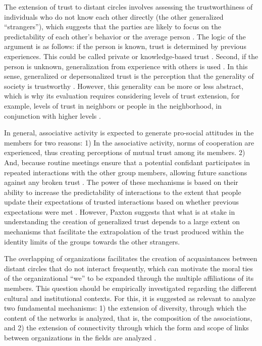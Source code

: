 The extension of trust to distant circles involves assessing the trustworthiness of individuals who do not know each other directly (the other generalized “strangers”), which suggests that the parties are likely to focus on the predictability of each other's behavior or the average person \parencite{glanville_why_2016,paxton_association_2007,paxton_is_2015}. The logic of the argument is as follows: if the person is known, trust is determined by previous experiences. This could be called private or knowledge-based trust \parencite{yamagishi_trust_1994,stolle_clubs_2001}. Second, if the person is unknown, generalization from experience with others is used \parencite{hardin_conceptions_2001}. In this sense, generalized or depersonalized trust is the perception that the generality of society is trustworthy \parencite{glanville_social_2013,paxton_social_2002,paxton_association_2007}. However, this generality can be more or less abstract, which is why its evaluation requires considering levels of trust extension, for example, levels of trust in neighbors or people in the neighborhood, in conjunction with higher levels \parencite{glanville_why_2016}.
\bigskip

In general, associative activity is expected to generate pro-social attitudes in the members for two reasons: 1) In the associative activity, norms of cooperation are experienced, thus creating perceptions of mutual trust among its members. 2) And, because routine meetings ensure that a potential confidant participates in repeated interactions with the other group members, allowing future sanctions against any broken trust \parencite{axelrod_evolution_1984,paxton_trust_2018}. The power of these mechanisms is based on their ability to increase the predictability of interactions to the extent that people update their expectations of trusted interactions based on whether previous expectations were met \parencite{paxton_trust_2018}. However, Paxton \citeyear{paxton_association_2007} suggests that what is at stake in understanding the creation of generalized trust depends to a large extent on mechanisms that facilitate the extrapolation of the trust produced within the identity limits of the groups towards the other strangers.
\bigskip

The overlapping of organizations facilitates the creation of acquaintances between distant circles that do not interact frequently, which can motivate the moral ties of the organizational “we” to be expanded through the multiple affiliations of its members. This question should be empirically investigated regarding the different cultural and institutional contexts. For this, it is suggested as relevant to analyze two fundamental mechanisms: 1) the extension of diversity, through which the content of the networks is analyzed, that is, the composition of the associations, and 2) the extension of connectivity through which the form and scope of links between organizations in the fields are analyzed \parencite{paxton_trust_2018}.

